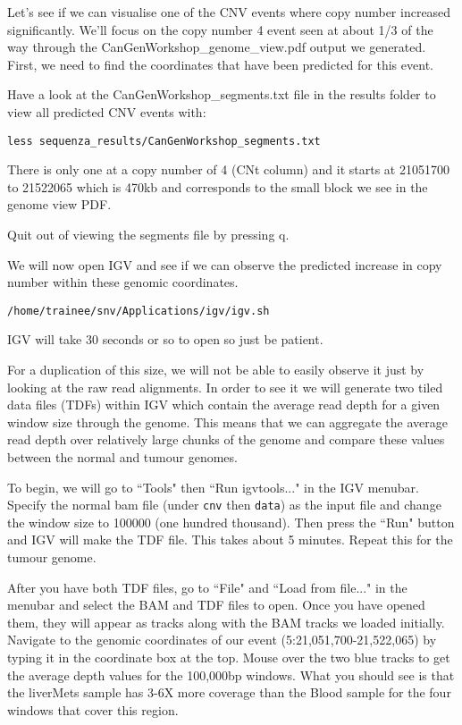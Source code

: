Let's see if we can visualise one of the CNV events where copy number increased significantly. We'll focus on the copy number 4 event seen at about 1/3 of the way through the CanGenWorkshop\_genome\_view.pdf output we generated. First, we need to find the coordinates that have been predicted for this event.\\

\begin{steps}
Have a look at the CanGenWorkshop\_segments.txt file in the results folder to view all predicted CNV events with:
\begin{lstlisting}
less sequenza_results/CanGenWorkshop_segments.txt
\end{lstlisting}
\end{steps}

There is only one at a copy number of 4 (CNt column) and it starts at 21051700 to 21522065 which is 470kb and corresponds to the small block we see in the genome view PDF.

Quit out of viewing the segments file by pressing q.\\

\begin{steps}
We will now open IGV and see if we can observe the predicted increase in copy number within these genomic coordinates.
\begin{lstlisting}
/home/trainee/snv/Applications/igv/igv.sh
\end{lstlisting}
\end{steps}

IGV will take 30 seconds or so to open so just be patient.

For a duplication of this size, we will not be able to easily observe it just by looking at the raw read alignments. In order to see it we will generate two tiled data files (TDFs) within IGV which contain the average read depth for a given window size through the genome. This means that we can aggregate the average read depth over relatively large chunks of the genome and compare these values between the normal and tumour genomes.

To begin, we will go to ``Tools" then ``Run igvtools..." in the IGV menubar. Specify the normal bam file (under \texttt{cnv} then \texttt{data}) as the input file and change the window size to 100000 (one hundred thousand). Then press the ``Run" button and IGV will make the TDF file. This takes about 5 minutes. Repeat this for the tumour genome.

After you have both TDF files, go to ``File" and ``Load from file..." in the menubar and select the BAM and TDF files to open. Once you have opened them, they will appear as tracks along with the BAM tracks we loaded initially. Navigate to the genomic coordinates of our event (5:21,051,700-21,522,065) by typing it in the coordinate box at the top. Mouse over the two blue tracks to get the average depth values for the 100,000bp windows. What you should see is that the liverMets sample has 3-6X more coverage than the Blood sample for the four windows that cover this region.

